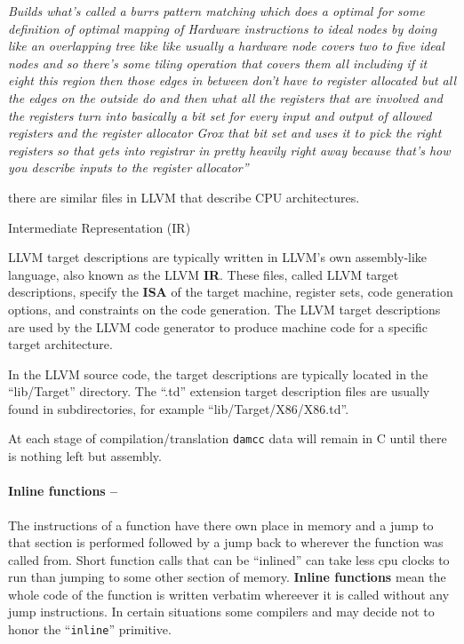 \emph{Builds what's called a burrs pattern matching which does a optimal
for some definition of optimal mapping of Hardware instructions to ideal
nodes by doing like an overlapping tree like like usually a hardware
node covers two to five ideal nodes and so there's some tiling operation
that covers them all including if it eight this region then those edges
in between don't have to register allocated but all the edges on the
outside do and then what all the registers that are involved and the
registers turn into basically a bit set for every input and output of
allowed registers and the register allocator Grox that bit set and uses
it to pick the right registers so that gets into registrar in pretty
heavily right away because that's how you describe inputs to the
register allocator''}

there are similar files in LLVM that describe CPU architectures.

Intermediate Representation (IR)

LLVM target descriptions are typically written in LLVM's own
assembly-like language, also known as the LLVM \textbf{IR}. These files,
called LLVM target descriptions, specify the \textbf{ISA} of the target
machine, register sets, code generation options, and constraints on the
code generation. The LLVM target descriptions are used by the LLVM code
generator to produce machine code for a specific target architecture.

In the LLVM source code, the target descriptions are typically located
in the ``lib/Target'' directory. The ``.td'' extension target
description files are usually found in subdirectories, for example
``lib/Target/X86/X86.td''.

At each stage of compilation/translation \texttt{damcc} data will remain
in C until there is nothing left but assembly.

\hypertarget{inline-functions}{%
\paragraph{Inline functions --}\label{inline-functions}}

The instructions of a function have there own place in memory and a jump
to that section is performed followed by a jump back to wherever the
function was called from. Short function calls that can be ``inlined''
can take less cpu clocks to run than jumping to some other section of
memory. \textbf{Inline functions} mean the whole code of the function is
written verbatim whereever it is called without any jump instructions.
In certain situations some compilers and may decide not to honor the
``\texttt{inline}'' primitive.

